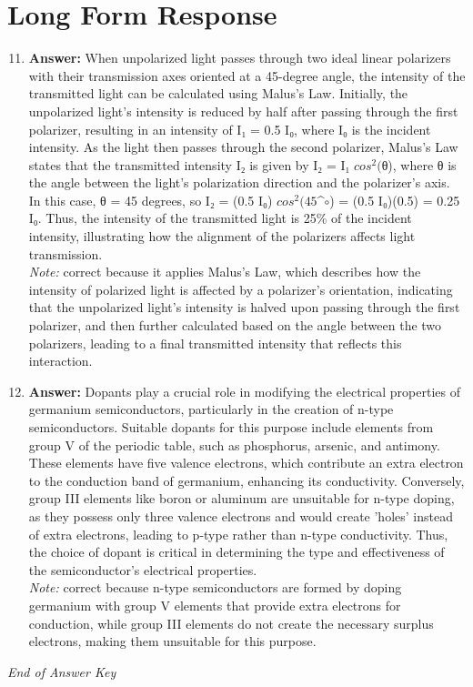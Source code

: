 \documentclass[12pt]{article}
\begin{document}
\section*{Long Form Response}
\begin{enumerate}[label=\arabic*.]
\setcounter{enumi}{10}
\item \textbf{Answer:} When unpolarized light passes through two ideal linear polarizers with their transmission axes oriented at a 45-degree angle, the intensity of the transmitted light can be calculated using Malus's Law. Initially, the unpolarized light's intensity is reduced by half after passing through the first polarizer, resulting in an intensity of I₁ = 0.5 I₀, where I₀ is the incident intensity. As the light then passes through the second polarizer, Malus's Law states that the transmitted intensity I₂ is given by I₂ = I₁ $cos^2($θ), where θ is the angle between the light's polarization direction and the polarizer's axis. In this case, θ = 45 degrees, so I₂ = (0.5 I₀) $cos^2(45$^\ensuremath{\circ}) = (0.5 I₀)(0.5) = 0.25 I₀. Thus, the intensity of the transmitted light is 25\% of the incident intensity, illustrating how the alignment of the polarizers affects light transmission.
\\ \textit{Note:} correct because it applies Malus's Law, which describes how the intensity of polarized light is affected by a polarizer's orientation, indicating that the unpolarized light's intensity is halved upon passing through the first polarizer, and then further calculated based on the angle between the two polarizers, leading to a final transmitted intensity that reflects this interaction.
\item \textbf{Answer:} Dopants play a crucial role in modifying the electrical properties of germanium semiconductors, particularly in the creation of n-type semiconductors. Suitable dopants for this purpose include elements from group V of the periodic table, such as phosphorus, arsenic, and antimony. These elements have five valence electrons, which contribute an extra electron to the conduction band of germanium, enhancing its conductivity. Conversely, group III elements like boron or aluminum are unsuitable for n-type doping, as they possess only three valence electrons and would create 'holes' instead of extra electrons, leading to p-type rather than n-type conductivity. Thus, the choice of dopant is critical in determining the type and effectiveness of the semiconductor's electrical properties.
\\ \textit{Note:} correct because n-type semiconductors are formed by doping germanium with group V elements that provide extra electrons for conduction, while group III elements do not create the necessary surplus electrons, making them unsuitable for this purpose.
\end{enumerate}

\vfill
\noindent\textit{End of Answer Key}
\end{document}
